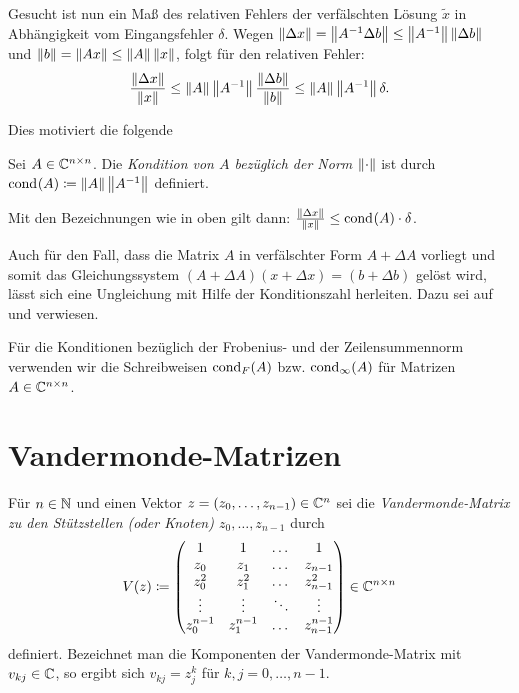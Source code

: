 \noindent Gesucht ist nun ein Maß des relativen Fehlers der verfälschten Lösung
$\tilde{x}$ in Abhängigkeit vom Eingangsfehler $\delta$.
Wegen $ \norm{\Delta x} = \norm{A^{-1} \Delta b} \leq \norm{A^{-1}} \norm{\Delta b} $
und $ \norm{b} = \norm{A x} \leq \norm{A} \norm{x} $,
folgt für den relativen Fehler:
\[
    \frac{\norm{\Delta x}}{\norm{x}}
    \leq \norm{A} \norm{A^{-1}} \frac{\norm{\Delta b}}{\norm{b}}
    \leq \norm{A} \norm{A^{-1}} \delta.
\]

\noindent Dies motiviert die folgende
\begin{mydef}
    Sei $A \in \C^{n \times n}$.
    Die \emph{Kondition von $A$ bezüglich der Norm $\emptynorm$} ist durch
    $\cond{A} \defeq \norm{A} \norm{A^{-1}}$
    definiert.
\end{mydef}

\begin{remark}
    Mit den Bezeichnungen wie in oben gilt dann: ${\frac{\norm{\Delta x}}{\norm{x}} \leq \cond{A} \cdot \delta }$.
\end{remark}

\begin{remark}
    Auch für den Fall, dass die Matrix $A$ in verfälschter Form $A + \Delta A$
    vorliegt und somit das Gleichungssystem $(A + \Delta A)(x + \Delta x) = (b
    + \Delta b)$ gelöst wird, lässt sich eine Ungleichung mit Hilfe der
    Konditionszahl herleiten. Dazu sei auf \cite[S. 203ff]{stoer1} und \cite[S.
    54ff]{schaback} verwiesen.
\end{remark}

\begin{notation}
    Für die Konditionen bezüglich der Frobenius- und der Zeilensummennorm
    verwenden wir die Schreibweisen $ \cond[F]{A} $ bzw. $\cond[\infty]{A}$ für
    Matrizen $A \in \C^{n\times n}$.
\end{notation}

\section{Vandermonde-Matrizen}

\begin{mydef}
    Für $n \in \N$ und einen Vektor ${z = (z_0, \dots, z_{n-1}) \in \Cn}$
    sei die
    \emph{Vandermonde-Matrix zu den Stützstellen (oder Knoten) $z_0, \dots, z_{n-1}$}
    durch
    \[
        \Vand{z} \defeq \begin{pmatrix}
            1         & 1         & \dots & 1 \\
            z_0       & z_1       & \dots & z_{n-1} \\
            z_0^2     & z_1^2     & \dots & z_{n-1}^2 \\
            \vdots    & \vdots    & \ddots & \vdots \\
            z_0^{n-1} & z_1^{n-1} & \dots & z_{n-1}^{n-1}
        \end{pmatrix} \in \C^{n \times n}
    \]
    definiert.
    Bezeichnet man die Komponenten der Vandermonde-Matrix mit
    $v_{kj} \in \C$, so ergibt sich
    $ v_{kj} = z_j^k $ für $k, j = 0, \dots, n-1$.

\end{mydef}

